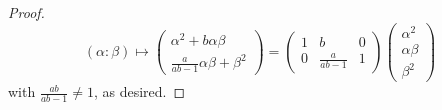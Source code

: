 \documentclass[10pt,a4paper]{amsart}
\renewcommand{\a}{\alpha}
\renewcommand{\b}{\beta}
\begin{document}
\begin{proof}
\[
(\a: \b) \mapsto 
\begin{pmatrix}
    \a^2+b\a \b \\
    \tfrac{a}{ab-1} \a \b+\b^2
\end{pmatrix}
=
\begin{pmatrix}
    1 & b & 0 \\
    0 & \tfrac{a}{ab-1} & 1
\end{pmatrix} 
\begin{pmatrix}
    \a^2 \\
    \a \b \\
    \b^2
\end{pmatrix}
\]
with $\tfrac{ab}{ab-1} \ne 1$, as desired.
\end{proof}
\end{document}
